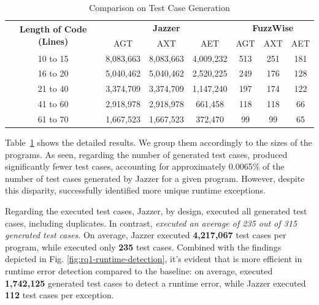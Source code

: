 \begin{table}
  \centering
  \small
  \caption{Comparison on Test Case Generation}
\label{tab:rq1coverageeval}
\begin{tabular}{c|ccc|ccc}
\hline
\multirow{2}{*}{\textbf{Length of Code (Lines)}} & \multicolumn{3}{c|}{\textbf{Jazzer}} & \multicolumn{3}{c}{\textbf{FuzzWise}} \\ \cline{2-7} 
 & \multicolumn{1}{c|}{AGT} & \multicolumn{1}{c|}{AXT} & AET & \multicolumn{1}{c|}{AGT} & \multicolumn{1}{c|}{AXT} & AET \\ \hline
10 to 15 & \multicolumn{1}{c|}{8,083,663} & \multicolumn{1}{c|}{8,083,663} & 4,009,232 & \multicolumn{1}{c|}{513} & \multicolumn{1}{c|}{251} & 181 \\
16 to 20 & \multicolumn{1}{c|}{5,040,462} & \multicolumn{1}{c|}{5,040,462} & 2,520,225 & \multicolumn{1}{c|}{249} & \multicolumn{1}{c|}{176} & 128 \\
21 to 40 & \multicolumn{1}{c|}{3,374,709} & \multicolumn{1}{c|}{3,374,709} & 1,147,240 & \multicolumn{1}{c|}{197} & \multicolumn{1}{c|}{174} & 122 \\ 
41 to 60 & \multicolumn{1}{c|}{2,918,978} & \multicolumn{1}{c|}{2,918,978} & {661,458} & \multicolumn{1}{c|}{118} & \multicolumn{1}{c|}{118} & 66 \\
61 to 70 & \multicolumn{1}{c|}{1,667,523} & \multicolumn{1}{c|}{1,667,523} & 372,470 & \multicolumn{1}{c|}{99} & \multicolumn{1}{c|}{99} & 65 \\ \hline
\end{tabular}%
\end{table}

Table~\ref{tab:rq1coverageeval} shows the detailed results.
We group them accordingly to the sizes of the programs. As seen,
regarding the number of generated test cases, {\tool} produced
significantly fewer test cases, accounting for approximately 0.0065\%
of the number of test cases generated by Jazzer for a given
program. However, despite this disparity, {\tool} successfully
identified more unique runtime exceptions.

Regarding the executed test cases, Jazzer, by design, executed all
generated test cases, including duplicates. In contrast, {\tool} {\em
  executed an average of 235 out of 315 generated test cases}. On
average, Jazzer executed {\bf 4,217,067} test cases per program, while
{\tool} executed only {\bf 235} test cases. Combined with the findings
depicted in Fig. \ref{fig:rq1-runtime-detection}, it's evident that
{\tool} is more efficient in runtime error detection compared to the
baseline: on average, {\tool} executed {\bf 1,742,125} generated test cases
to detect a runtime error, while Jazzer executed {\bf 112} test cases
per exception.

